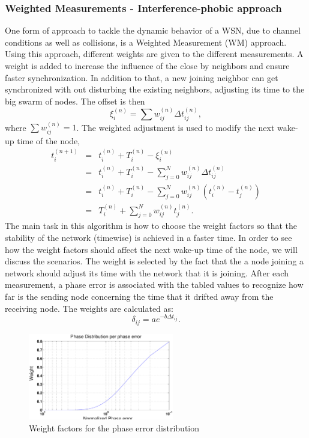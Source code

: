 \documentclass[journal]{IEEEtran}
\begin{document}
\subsubsection{\textbf{Weighted Measurements - Interference-phobic approach}}
One form of approach to tackle the dynamic behavior of a WSN, due to channel conditions as well as collisions, is a
Weighted Measurement (WM) approach. Using this approach, different
weights are given to the different measurements. A weight is added to
increase the influence of the close by neighbors and ensure
faster synchronization. In addition to that, a new joining neighbor
can get synchronized with out disturbing the existing neighbors,
adjusting its time to the big swarm of nodes.\newline
The offset is then 
\begin{equation}
\xi_i^{(n)} = \sum{w_{ij}^{(n)}\Delta t_{ij}^{(n)}} ,
\end{equation}
where $\sum{w_{ij}^{(n)}= 1}$.
\newline
The weighted adjustment is used to modify the next wake-up time of
the node,
\begin{eqnarray*}
t_i^{(n+1)} &=& t_i^{(n)} + T_i^{(n)} - \xi_i^{(n)} \\ &=& t_i^{(n)}
+ T_i^{(n)} - \sum_{j=0}^N{w_{ij}^{(n)}\Delta t_{ij}^{(n)}} \\ &=&
t_i^{(n)}+ T_i^{(n)} -
\sum_{j=0}^N{w_{ij}^{(n)}(t_i^{(n)}-t_j^{(n)})} \\ &=& T_i^{(n)} + \sum_{j=0}^N{w_{ij}^{(n)}t_j^{(n)}}.
\end{eqnarray*}
\newline
The main task in this algorithm is how to choose the weight factors so that the stability of the network (timewise) is achieved in a faster time. In order to see how the weight factors should affect the next wake-up time of the node, we will discuss the scenarios.
\newline
The weight is selected by the fact that the a node joining a network should adjust its time with the network that it is joining. After
each measurement, a phase error is associated with the tabled values to recognize how far is the sending node concerning the time that it
drifted away from the receiving node. The weights are calculated as:
\begin{equation}
\delta_{ij} = ae^{-b\Delta t_{ij}}.
\end{equation}
\begin{figure}[t]
\centering
\includegraphics[width= 2.5in]{weight}
\caption{Weight factors for the phase error distribution}
\label{weight}
\end{figure}
\end{document}
